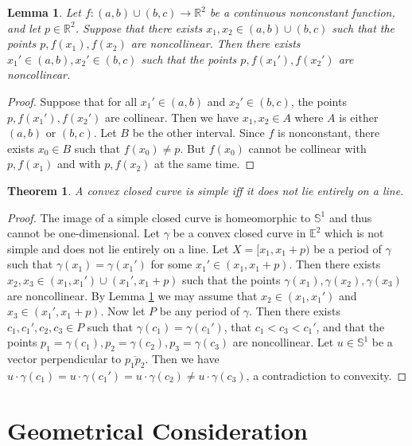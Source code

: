 \documentclass{amsart}
\newtheorem{lemma}[proposition]{Lemma}
\newtheorem{theorem}[proposition]{Theorem}
\theoremstyle{definition}
\theoremstyle{remark}
\begin{document}
\begin{lemma}
    \label{lem}
    Let $f:(a,b)\cup(b,c)\to\mathbb{R}^2$ be a continuous
    nonconstant function, and let $p\in\mathbb{R}^2$.
    Suppose that there exists $x_1,x_2\in(a,b)\cup(b,c)$ such that
    the points $p,f(x_1),f(x_2)$ are noncollinear.
    Then there exists $x_1'\in(a,b),x_2'\in(b,c)$ such that
    the points $p,f(x_1'),f(x_2')$ are noncollinear.
\end{lemma}

\begin{proof}
    Suppose that for all $x_1'\in(a,b)$ and $x_2'\in(b,c)$,
    the points $p,f(x_1'),f(x_2')$ are collinear.
    Then we have $x_1,x_2\in A$ where
    $A$ is either $(a,b)$ or $(b,c)$. Let $B$ be the other interval.
    Since $f$ is nonconstant, there exists $x_0\in B$
    such that $f(x_0)\ne p$. But $f(x_0)$ cannot be collinear
    with $p,f(x_1)$ and with $p,f(x_2)$ at the same time.
\end{proof}

\begin{theorem}
    \label{thm:main}
    A convex closed curve is simple iff
    it does not lie entirely on a line.
\end{theorem}

\begin{proof}
    The image of a simple closed curve is homeomorphic to
    $\mathbb{S}^1$ and thus cannot be one-dimensional.
    Let $\gamma$ be a convex closed curve in $\mathbb{E}^2$
    which is not simple and does not lie entirely on a line.
    Let $X=[x_1,x_1+p)$ be a period of $\gamma$ such that
    $\gamma(x_1)=\gamma(x_1')$ for some $x_1'\in(x_1,x_1+p)$.
    Then there exists $x_2,x_3\in(x_1,x_1')\cup(x_1',x_1+p)$
    such that the points $\gamma(x_1),\gamma(x_2),\gamma(x_3)$ are
    noncollinear. By Lemma \ref{lem} we may assume that
    $x_2\in(x_1,x_1')$ and $x_3\in(x_1',x_1+p)$.
    Now let $P$ be any period of $\gamma$. Then there exists
    $c_1,c_1',c_2,c_3\in P$ such that $\gamma(c_1)=\gamma(c_1')$,
    that $c_1<c_3<c_1'$, and that the points
    $p_1=\gamma(c_1),p_2=\gamma(c_2),p_3=\gamma(c_3)$ are noncollinear.
    Let $u\in\mathbb{S}^1$ be a vector perpendicular to
    $\overline{p_1p_2}$. Then we have
    $u\cdot\gamma(c_1)=u\cdot\gamma(c_1')=u\cdot\gamma(c_2)
        \ne u\cdot\gamma(c_3)$, a contradiction to convexity.
\end{proof}

\section{Geometrical Consideration}
\end{document}
